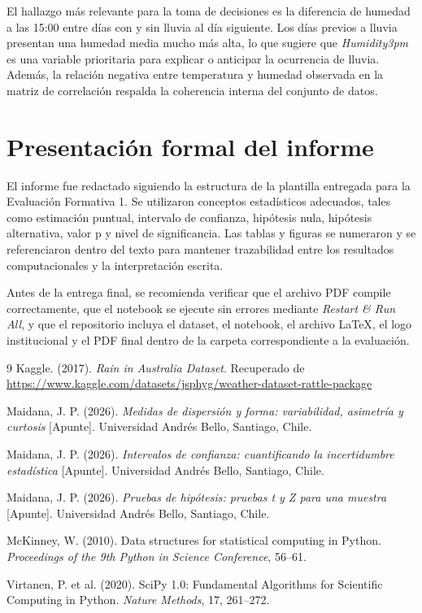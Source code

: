 \documentclass[11pt,a4paper]{article}
\begin{document}
El hallazgo más relevante para la toma de decisiones es la diferencia de humedad a las 15:00 entre días con y sin lluvia al día siguiente. Los días previos a lluvia presentan una humedad media mucho más alta, lo que sugiere que \textit{Humidity3pm} es una variable prioritaria para explicar o anticipar la ocurrencia de lluvia. Además, la relación negativa entre temperatura y humedad observada en la matriz de correlación respalda la coherencia interna del conjunto de datos.

\section{Presentación formal del informe}

El informe fue redactado siguiendo la estructura de la plantilla entregada para la Evaluación Formativa 1. Se utilizaron conceptos estadísticos adecuados, tales como estimación puntual, intervalo de confianza, hipótesis nula, hipótesis alternativa, valor p y nivel de significancia. Las tablas y figuras se numeraron y se referenciaron dentro del texto para mantener trazabilidad entre los resultados computacionales y la interpretación escrita.

Antes de la entrega final, se recomienda verificar que el archivo PDF compile correctamente, que el notebook se ejecute sin errores mediante \textit{Restart \& Run All}, y que el repositorio incluya el dataset, el notebook, el archivo LaTeX, el logo institucional y el PDF final dentro de la carpeta correspondiente a la evaluación.

\clearpage
{}
{}
\begin{thebibliography}{9}
Kaggle. (2017). \textit{Rain in Australia Dataset}. Recuperado de \url{https://www.kaggle.com/datasets/jsphyg/weather-dataset-rattle-package}

Maidana, J. P. (2026). \textit{Medidas de dispersión y forma: variabilidad, asimetría y curtosis} [Apunte]. Universidad Andrés Bello, Santiago, Chile.

Maidana, J. P. (2026). \textit{Intervalos de confianza: cuantificando la incertidumbre estadística} [Apunte]. Universidad Andrés Bello, Santiago, Chile.

Maidana, J. P. (2026). \textit{Pruebas de hipótesis: pruebas t y Z para una muestra} [Apunte]. Universidad Andrés Bello, Santiago, Chile.

McKinney, W. (2010). Data structures for statistical computing in Python. \textit{Proceedings of the 9th Python in Science Conference}, 56--61.

Virtanen, P. et al. (2020). SciPy 1.0: Fundamental Algorithms for Scientific Computing in Python. \textit{Nature Methods}, 17, 261--272.
\end{thebibliography}
\end{document}
